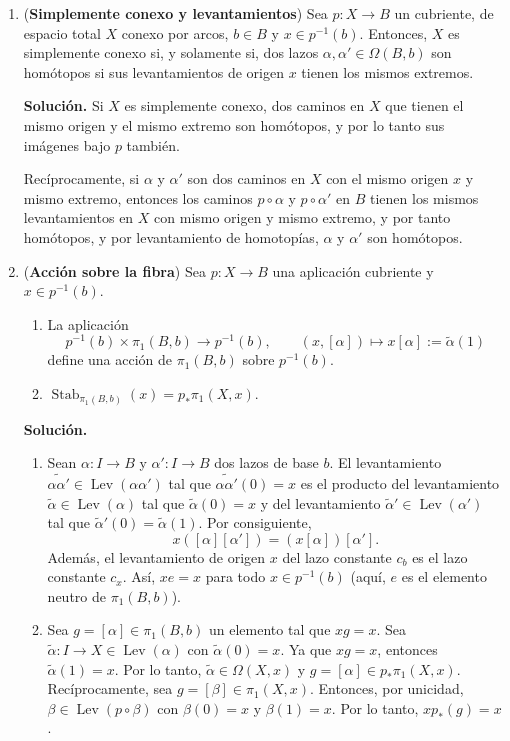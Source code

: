 \documentclass[11pt,a4paper]{article}
\theoremstyle{plain}
\theoremstyle{definition}
\theoremstyle{remark}
\DeclareMathOperator{\Stab}{Stab}
\DeclareMathOperator{\Lev}{Lev}
\begin{document}
\begin{enumerate}[label=\arabic*.,leftmargin=*]
\item (\textbf{Simplemente conexo y levantamientos}) Sea $p:X\to B$ un
cubriente, de espacio total $X$ conexo por arcos, $b\in B$ y
$x\in p^{-1}(b)$. Entonces, $X$ es simplemente conexo si, y solamente si,
dos lazos $\alpha,\alpha'\in\Omega(B,b)$ son homótopos si sus
levantamientos de origen $x$ tienen los mismos extremos.

\noindent\textbf{Solución.} Si $X$ es simplemente conexo, dos caminos en
$X$ que tienen el mismo origen y el mismo extremo son homótopos, y por lo
tanto sus imágenes bajo $p$ también.

Recíprocamente, si $\alpha$ y $\alpha'$ son dos caminos en $X$ con el mismo
origen $x$ y mismo extremo, entonces los caminos $p\circ\alpha$ y
$p\circ\alpha'$ en $B$ tienen los mismos levantamientos en $X$ con mismo
origen y mismo extremo, y por tanto homótopos, y por levantamiento de
homotopías, $\alpha$ y $\alpha'$ son homótopos.

\item (\textbf{Acción sobre la fibra}) Sea $p:X\to B$ una aplicación
cubriente y $x\in p^{-1}(b)$.
\begin{enumerate}[label=\alph*)]
\item La aplicación
\[
p^{-1}(b)\times\pi_1(B,b)\to p^{-1}(b), \qquad (x,[\alpha])\mapsto x[\alpha]:=\tilde\alpha(1)
\]
define una acción de $\pi_1(B,b)$ sobre $p^{-1}(b)$.
\item $\Stab_{\pi_1(B,b)}(x)=p_*\pi_1(X,x)$.
\end{enumerate}

\noindent\textbf{Solución.}
\begin{enumerate}[label=\alph*)]
\item Sean $\alpha:I\to B$ y $\alpha':I\to B$ dos lazos de base $b$. El
levantamiento $\widetilde{\alpha\alpha'}\in\Lev(\alpha\alpha')$ tal que
$\widetilde{\alpha\alpha'}(0)=x$ es el producto del levantamiento
$\tilde\alpha\in\Lev(\alpha)$ tal que $\tilde\alpha(0)=x$ y del
levantamiento $\tilde\alpha'\in\Lev(\alpha')$ tal que
$\tilde\alpha'(0)=\tilde\alpha(1)$. Por consiguiente,
\[
x([\alpha][\alpha'])=(x[\alpha])[\alpha'].
\]
Además, el levantamiento de origen $x$ del lazo constante $c_b$ es el lazo
constante $c_x$. Así, $xe=x$ para todo $x\in p^{-1}(b)$ (aquí, $e$ es el
elemento neutro de $\pi_1(B,b)$).
\item Sea $g=[\alpha]\in\pi_1(B,b)$ un elemento tal que $xg=x$. Sea
$\tilde\alpha:I\to X\in\Lev(\alpha)$ con $\tilde\alpha(0)=x$. Ya que $xg=x$,
entonces $\tilde\alpha(1)=x$. Por lo tanto,
$\tilde\alpha\in\Omega(X,x)$ y $g=[\alpha]\in p_*\pi_1(X,x)$.
Recíprocamente, sea $g=[\beta]\in\pi_1(X,x)$. Entonces, por unicidad,
$\beta\in\Lev(p\circ\beta)$ con $\beta(0)=x$ y $\beta(1)=x$. Por lo tanto,
$xp_*(g)=x$.
\end{enumerate}


\end{enumerate}
\end{document}
